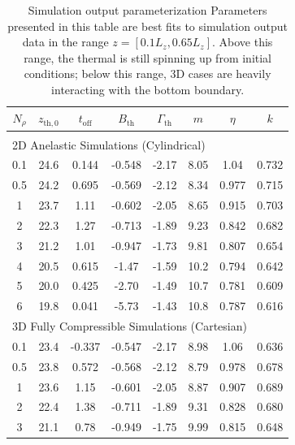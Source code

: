 \begin{table}
\caption[Measured values of constants in thermal evolution theory.]
{Simulation output parameterization
\label{table:parameters}
Parameters presented in this table are best fits to simulation output data in the range $z = [0.1 L_z, 0.65 L_z]$.
Above this range, the thermal is still spinning up from initial conditions; below this range, 3D cases are heavily interacting with the bottom boundary.
}
\begin{center}
\begin{tabular}{c c c c c c c c}
$N_\rho$ & $z_{\text{th},0}$ & $t_{\text{off}}$ & $B_{\text{th}}$ & $\Gamma_{\text{th}}$ & $m$ & $\eta$ & $k$ \\
\hline\hline\\
\multicolumn{8}{l}{2D Anelastic Simulations (Cylindrical)}\\
0.1 	&  24.6 	& 0.144	& -0.548 & -2.17 & 8.05	& 1.04	& 0.732	\\
0.5 	&  24.2 	& 0.695	& -0.569 & -2.12 & 8.34	& 0.977	& 0.715	\\
1	 	&  23.7 	& 1.11 	& -0.602 & -2.05 & 8.65	& 0.915	& 0.703	\\
2	 	&  22.3 	& 1.27	& -0.713 & -1.89 & 9.23	& 0.842 & 0.682	\\
3	 	&  21.2 	& 1.01	& -0.947 & -1.73 & 9.81	& 0.807	& 0.654	\\
4	 	&  20.5 	& 0.615	& -1.47	 & -1.59 & 10.2	& 0.794	& 0.642	\\
5	 	&  20.0	    & 0.425	& -2.70	 & -1.49 & 10.7	& 0.781	& 0.609	\\
6	 	&  19.8 	& 0.041	& -5.73	 & -1.43 & 10.8	& 0.787	& 0.616	\\
\multicolumn{8}{l}{3D Fully Compressible Simulations (Cartesian)}\\    
0.1 	&  23.4 	& -0.337& -0.547 & -2.17 & 8.98	& 1.06	& 0.636	\\
0.5 	&  23.8 	& 0.572	& -0.568 & -2.12 & 8.79	& 0.978	& 0.678	\\
1	 	&  23.6 	& 1.15	& -0.601 & -2.05 & 8.87	& 0.907	& 0.689	\\
2	 	&  22.4 	& 1.38	& -0.711 & -1.89 & 9.31	& 0.828	& 0.680	\\
3	 	&  21.1 	& 0.78	& -0.949 & -1.75 & 9.99	& 0.815	& 0.648	\\
\hline
\end{tabular}
\end{center}
\end{table}



